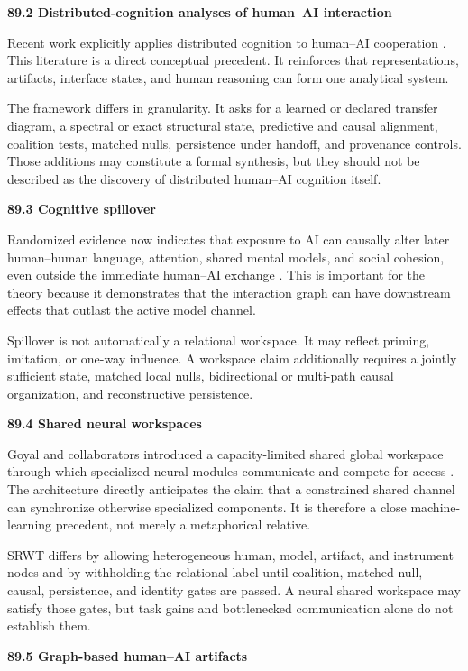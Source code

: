 \documentclass[11pt,letterpaper]{article}
\newcommand{\subtopic}[1]{%
 \vspace{0.45em}
 {\bfseries\color{AccentColor} #1\par}
}
\theoremstyle{plain}
\theoremstyle{definition}
\begin{document}
\subtopic{89.2 Distributed-cognition analyses of human--AI interaction}

Recent work explicitly applies distributed cognition to human--AI cooperation
\cite{SidjiEtAl2024,ZhaoHan2026}. This literature is a direct conceptual
precedent. It reinforces that representations, artifacts, interface states,
and human reasoning can form one analytical system.

The framework differs in granularity. It asks for a learned or declared
transfer diagram, a spectral or exact structural state, predictive and causal
alignment, coalition tests, matched nulls, persistence under handoff, and
provenance controls. Those additions may constitute a formal synthesis, but
they should not be described as the discovery of distributed human--AI
cognition itself.

\subtopic{89.3 Cognitive spillover}

Randomized evidence now indicates that exposure to AI can causally alter later
human--human language, attention, shared mental models, and social cohesion,
even outside the immediate human--AI exchange \cite{RiedlEtAl2026}. This is
important for the theory because it demonstrates that the interaction graph can
have downstream effects that outlast the active model channel.

Spillover is not automatically a relational workspace. It may reflect
priming, imitation, or one-way influence. A workspace claim additionally
requires a jointly sufficient state, matched local nulls, bidirectional or
multi-path causal organization, and reconstructive persistence.

\subtopic{89.4 Shared neural workspaces}

Goyal and collaborators introduced a capacity-limited shared global workspace
through which specialized neural modules communicate and compete for access
\cite{GoyalEtAl2022}. The architecture directly anticipates the claim that a
constrained shared channel can synchronize otherwise specialized components.
It is therefore a close machine-learning precedent, not merely a metaphorical
relative.

SRWT differs by allowing heterogeneous human, model, artifact, and instrument
nodes and by withholding the relational label until coalition, matched-null,
causal, persistence, and identity gates are passed. A neural shared workspace
may satisfy those gates, but task gains and bottlenecked communication alone do
not establish them.

\subtopic{89.5 Graph-based human--AI artifacts}
\end{document}
